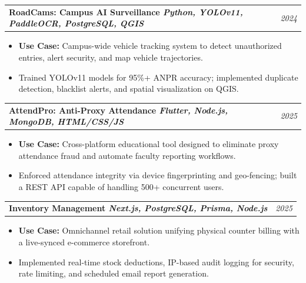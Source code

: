 \documentclass[a4paper,11pt]{article}
\makeatletter
\newcommand{\projectHeading}[2]{
  \vspace{2pt}\noindent
  \begin{tabularx}{\textwidth}{@{}X r@{}}
    \textbf{#1} & \textit{\small #2}
  \end{tabularx}
  \vspace{-3pt}
}
\makeatother
\begin{document}
\projectHeading
  {RoadCams: Campus AI Surveillance \enspace\textnormal{\small\textbar\enspace \textit{Python, YOLOv11, PaddleOCR, PostgreSQL, QGIS}}}
  {2024}
\begin{itemize}
  \item \textbf{Use Case:} Campus-wide vehicle tracking system to detect unauthorized entries, alert security, and map vehicle trajectories.
  \item Trained YOLOv11 models for 95\%+ ANPR accuracy; implemented duplicate detection, blacklist alerts, and spatial visualization on QGIS.
\end{itemize}

\projectHeading
  {AttendPro: Anti-Proxy Attendance \enspace\textnormal{\small\textbar\enspace \textit{Flutter, Node.js, MongoDB, HTML/CSS/JS}}}
  {2025}
\begin{itemize}
  \item \textbf{Use Case:} Cross-platform educational tool designed to eliminate proxy attendance fraud and automate faculty reporting workflows.
  \item Enforced attendance integrity via device fingerprinting and geo-fencing; built a REST API capable of handling 500+ concurrent users.
\end{itemize}

\projectHeading
  {Inventory Management \enspace\textnormal{\small\textbar\enspace \textit{Next.js, PostgreSQL, Prisma, Node.js}}}
  {2025}
\begin{itemize}
  \item \textbf{Use Case:} Omnichannel retail solution unifying physical counter billing with a live-synced e-commerce storefront.
  \item Implemented real-time stock deductions, IP-based audit logging for security, rate limiting, and scheduled email report generation.
\end{itemize}
\end{document}
